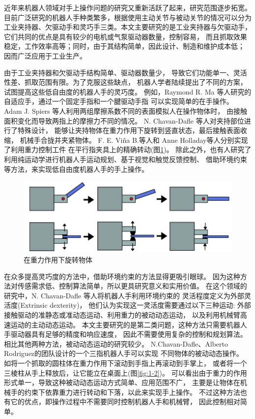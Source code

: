 近年来机器人领域对手上操作问题的研究又重新活跃了起来，研究范围逐步拓宽。
目前广泛研究的机器人手种类繁多，根据使用主动关节与被动关节的情况可以分为
工业夹持器、欠驱动手和灵巧手三类。本文主要研究的是工业夹持器与欠驱动手，
它们共同的优点是具有较少的电机或气泵驱动器数量，控制容易，
而且抓取效果稳定，工作效率高等；同时，由于其结构简单，因此设计、制造和维护成本低；
因而广泛应用于工业生产。

由于工业夹持器和欠驱动手结构简单、驱动器数量少，
导致它们功能单一、灵活性差、抓取范围有限。为了克服这些缺点，
机器人学者陆续提出了不同的方案，试图提高这些低自由度的机器人手的灵巧度。
例如，Raymond R. Ma 等人研究的自适应手，通过一个固定手指和一个腱驱动手指
可以实现简单的在手操作\cite{ref2}。
Adam J. Spiers 等人利用两组摩擦系数不同的表面模拟人在操作物体时，
由接触面积变化而导致两指上的摩擦力不同的情况\cite{ref3}。
N. Chavan-Dafle 等人对夹持部位进行了特殊设计，
能够让夹持物体在重力作用下旋转到竖直状态，最后接触表面收缩，
机械手合拢并夹紧物体\cite{ref4}。
F. E. Viña B.等人和 Anne Holladay等人分别实现了利用重力控制工件
在平行指夹具上的精确转动\cite{ref5,ref6}(图\ref{fig:1-1})。
除此之外，也有人研究了利用纯运动学进行机器人手运动规划、基于视觉和触觉反馈控制、
借助环境约束等方法，来实现低自由度机器人手的手上操作\cite{ref1}。

\begin{figure}[!ht]
  \centering
  \includegraphics[scale=1.2]{chapter01/pics/1-1}
  \caption{在重力作用下旋转物体}
  \label{fig:1-1}
  \vspace{-0.3cm}
\end{figure}

在众多提高灵巧度的方法中，借助环境约束的方法显得更吸引眼球。
因为这种方法对传感需求低、控制算法简单，所以更具研究意义和实用价值。
在这个领域的研究中，N. Chavan-Dafle 等人将机器人手利用环境约束的
灵活程度定义为外部灵活度(Extrinsic dexterity)，
他们认为实现这一灵活度需要通过以下三种运动:
外部接触驱动的准静态或准动态运动、利用重力的被动动态运动，
以及利用机械臂高速运动的主动动态运动\cite{ref7}。
本文主要研究的是第二类问题，这种方法只需要机器人手驱动器具有足够的精度和响应速度，
因此不需要使用复杂的控制和规划算法。
相比其他两种方法，被动动态运动的研究较少。
N.Chavan-Dafle、Alberto Rodriguez的团队设计的一个三指机器人手可以实现
不同物体的被动动态操作。
如将一个抓取的圆柱体在重力作用下滚动到手指上再滚动到手掌上，
或者将一个三棱柱从手上释放后，让它能立在桌面上\cite{ref7}(图\ref{fig:1-2})。
可以看出由于重力的作用形式单一，导致这种被动动态运动方式简单、应用范围不广，
主要是让物体在机械手的约束下依靠重力进行转动和下落，以此来实现手上操作。
不过这种方法也有它的优点，即操作过程中不需要同时控制机器人手和机械臂，
因此控制相对简单。

